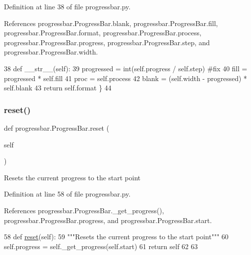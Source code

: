 Definition at line 38 of file progressbar.\+py.



References progressbar.\+Progress\+Bar.\+blank, progressbar.\+Progress\+Bar.\+fill, progressbar.\+Progress\+Bar.\+format, progressbar.\+Progress\+Bar.\+process, progressbar.\+Progress\+Bar.\+progress, progressbar.\+Progress\+Bar.\+step, and progressbar.\+Progress\+Bar.\+width.


\begin{DoxyCode}
38     \textcolor{keyword}{def }\_\_str\_\_(self):
39         progressed = int(self.progress / self.step) \textcolor{comment}{#fix}
40         fill = progressed * self.fill
41         proc = self.process
42         blank = (self.width - progressed) * self.blank
43         \textcolor{keywordflow}{return} self.format %
      \}
44 
\end{DoxyCode}
\mbox{\label{classprogressbar_1_1ProgressBar_aefc445915e4d1eb0bbf962857c122dac}} 
\subsubsection{\texorpdfstring{reset()}{reset()}}
{\footnotesize\ttfamily def progressbar.\+Progress\+Bar.\+reset (\begin{DoxyParamCaption}\item[{}]{self }\end{DoxyParamCaption})\hspace{0.3cm}{\ttfamily [inherited]}}

\begin{DoxyVerb}Resets the current progress to the start point\end{DoxyVerb}
 

Definition at line 58 of file progressbar.\+py.



References progressbar.\+Progress\+Bar.\+\_\+get\+\_\+progress(), progressbar.\+Progress\+Bar.\+progress, and progressbar.\+Progress\+Bar.\+start.


\begin{DoxyCode}
58     \textcolor{keyword}{def }\hyperlink{namespaceshell_a2f31bbe4baf894f4863c4d392239ab8b}{reset}(self):
59         \textcolor{stringliteral}{"""Resets the current progress to the start point"""}
60         self.progress = self.\_get\_progress(self.start)
61         \textcolor{keywordflow}{return} self
62 
63 
\end{DoxyCode}
\mbox{\label{classprogressbar_1_1ProgressBar_a0794442f190ed0d6e5b894f29881758b}} 
